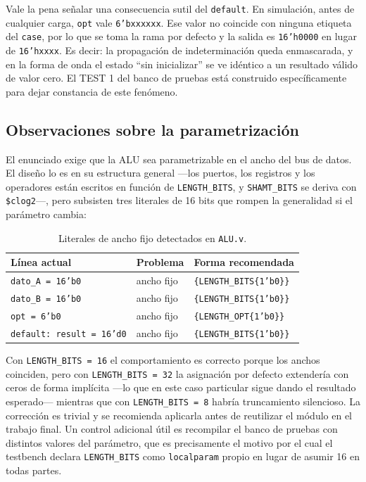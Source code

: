 \documentclass[12pt,a4paper]{article}
\begin{document}
Vale la pena señalar una consecuencia sutil del \texttt{default}. En simulación,
antes de cualquier carga, \texttt{opt} vale \texttt{6'bxxxxxx}. Ese valor no
coincide con ninguna etiqueta del \texttt{case}, por lo que se toma la rama por
defecto y la salida es \texttt{16'h0000} en lugar de \texttt{16'hxxxx}. Es
decir: la propagación de indeterminación queda enmascarada, y en la forma de
onda el estado ``sin inicializar'' se ve idéntico a un resultado válido de
valor cero. El TEST 1 del banco de pruebas está construido específicamente para
dejar constancia de este fenómeno.

\subsection{Observaciones sobre la parametrización}
\label{sec:paramobs}

El enunciado exige que la ALU sea parametrizable en el ancho del bus de datos.
El diseño lo es en su estructura general —los puertos, los registros y los
operadores están escritos en función de \texttt{LENGTH\_BITS}, y
\texttt{SHAMT\_BITS} se deriva con \texttt{\$clog2}—, pero subsisten tres
literales de 16 bits que rompen la generalidad si el parámetro cambia:

\begin{table}[H]
  \centering
  \begin{tabular}{lll}
    \toprule
    \textbf{Línea actual} & \textbf{Problema} & \textbf{Forma recomendada} \\
    \midrule
    \texttt{dato\_A = 16'b0} & ancho fijo & \texttt{\{LENGTH\_BITS\{1'b0\}\}} \\
    \texttt{dato\_B = 16'b0} & ancho fijo & \texttt{\{LENGTH\_BITS\{1'b0\}\}} \\
    \texttt{opt = 6'b0}      & ancho fijo & \texttt{\{LENGTH\_OPT\{1'b0\}\}} \\
    \texttt{default: result = 16'd0} & ancho fijo & \texttt{\{LENGTH\_BITS\{1'b0\}\}} \\
    \bottomrule
  \end{tabular}
  \caption{Literales de ancho fijo detectados en \texttt{ALU.v}.}
  \label{tab:literales}
\end{table}

Con \texttt{LENGTH\_BITS = 16} el comportamiento es correcto porque los anchos
coinciden, pero con \texttt{LENGTH\_BITS = 32} la asignación por defecto
extendería con ceros de forma implícita —lo que en este caso particular sigue
dando el resultado esperado— mientras que con \texttt{LENGTH\_BITS = 8} habría
truncamiento silencioso. La corrección es trivial y se recomienda aplicarla
antes de reutilizar el módulo en el trabajo final. Un control adicional útil es
recompilar el banco de pruebas con distintos valores del parámetro, que es
precisamente el motivo por el cual el testbench declara \texttt{LENGTH\_BITS}
como \texttt{localparam} propio en lugar de asumir 16 en todas partes.
\end{document}
